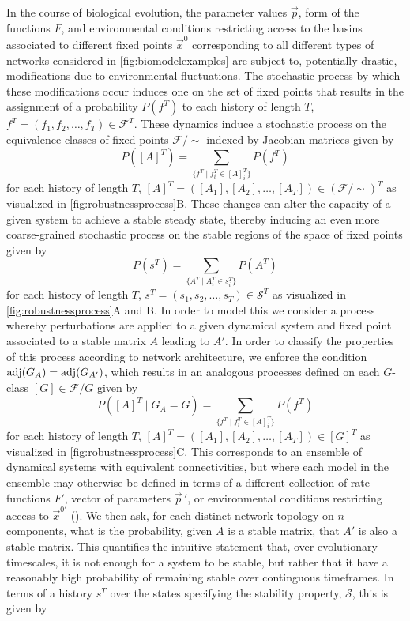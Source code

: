 In the course of biological evolution, the parameter values $\vec{p}$, form of the functions $F$, and environmental conditions restricting access to the basins associated to different fixed points $\vec{x}^0$ corresponding to all different types of networks considered in \ref{fig:biomodelexamples} are subject to, potentially drastic, modifications due to environmental fluctuations. The stochastic process by which these modifications occur induces one on the set of fixed points that results in the assignment of a probability $P(f^T)$ to each history of length $T$, $f^T = ( f_1,f_2,\ldots,f_T ) \in \mathcal{F}^T$.
These dynamics induce a stochastic process on the equivalence classes of fixed points $\mathcal{F}/{\sim}$ indexed by Jacobian matrices given by
$$
P([A]^T) = \sum_{ \{ f^T \mid f_i^T \in [A]_i^T \} } P(f^T)
$$
for each history of length $T$, $[A]^T = ( [A_1], [A_2], \ldots, [A_T] ) \in (\mathcal{F}/{\sim})^T$
as visualized in \ref{fig:robustnessprocess}B. These changes can alter the capacity of a given system to achieve a stable steady state, thereby inducing an even more coarse-grained stochastic process on the stable regions of the space of fixed points given by
$$
P(s^T) = \sum_{ \{ A^T \mid A_i^T \in s_i^T \} } P(A^T)
$$
for each history of length $T$, $s^T = ( s_1, s_2, \ldots, s_T ) \in \mathcal{S}^T$
as visualized in \ref{fig:robustnessprocess}A and B. In order to model this we consider a process whereby perturbations are applied to a given dynamical system and fixed point associated to a stable matrix $A$ leading to $A'$. In order to classify the properties of this process according to network architecture, we enforce the condition $\mathrm{adj}(G_A) = \mathrm{adj}(G_{A'})$, which results in an analogous processes defined on each $G$-class $[G] \in \mathcal{F}/G$ given by
$$
P([A]^T \mid G_A {=} G) = \sum_{ \{ f^T \mid f_i^T \in [A]_i^T \} } P(f^T)
$$
for each history of length $T$, $[A]^T = ( [A_1], [A_2], \ldots, [A_T] ) \in [G]^T$
as visualized in \ref{fig:robustnessprocess}C. This corresponds to an ensemble of dynamical systems with equivalent connectivities, but where each model in the ensemble may otherwise be defined in terms of a different collection of rate functions $F'$, vector of parameters ${\vec{p}}\,'$, or environmental conditions restricting access to $\vec{x}^{0'}$ (). We then ask, for each distinct network topology on $n$ components, what is the probability, given $A$ is a stable matrix, that $A'$ is also a stable matrix. This quantifies the intuitive statement that, over evolutionary timescales, it is not enough for a system to be stable, but rather that it have a reasonably high probability of remaining stable over continguous timeframes. In terms of a history $s^T$ over the states specifying the stability property, $\mathcal{S}$, this is given by
